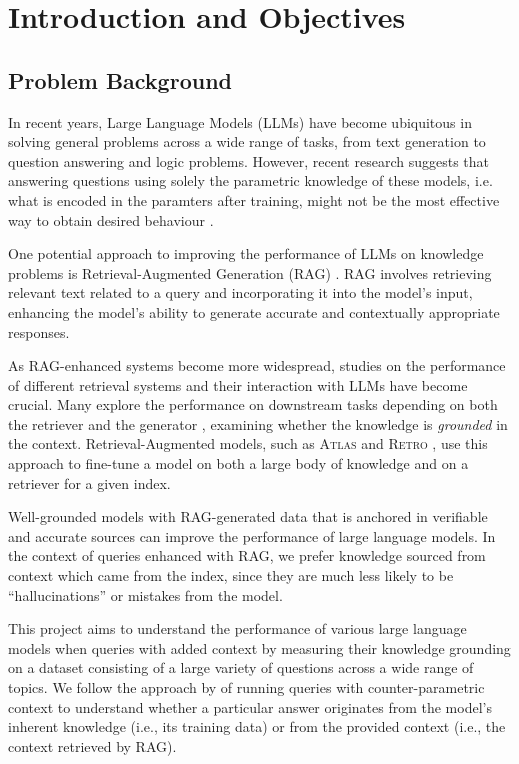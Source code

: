 \section{Introduction and Objectives}

\subsection{Problem Background}

In recent years, Large Language Models (LLMs) have become ubiquitous in solving general problems across a wide range of tasks, from text generation to question answering and logic problems.
However, recent research suggests that answering questions using solely the parametric knowledge of these models, i.e. what is encoded in the paramters after training, might not be the most effective way to obtain desired behaviour 
\citep{treeofthoughts}.

One potential approach to improving the performance of LLMs on knowledge problems is Retrieval-Augmented Generation (RAG) \citep{rag}. 
RAG involves retrieving relevant text related to a query and incorporating it into the model's input, enhancing the model's ability to generate accurate and contextually appropriate responses.

As RAG-enhanced systems become more widespread, studies on the performance of different retrieval systems and their interaction with LLMs have become crucial.
Many explore the performance on downstream tasks depending on both the retriever and the generator \citep{can_rag_models_reason,gpt3}, examining whether the knowledge is \textit{grounded} in the context.
Retrieval-Augmented models, such as \textsc{Atlas} \citep{atlas_foundational} and \textsc{Retro} \citep{retro}, use this approach to fine-tune a model on both a large body of knowledge and on a retriever for a given index.

Well-grounded models with RAG-generated data that is anchored in verifiable and accurate sources can improve the performance of large language models.
In the context of queries enhanced with RAG, we prefer knowledge sourced from context which came from the index, since they are much less likely to be ``hallucinations'' or mistakes from the model.

This project aims to understand the performance of various large language models when queries with added context by measuring their knowledge grounding on a dataset consisting of a large variety of questions across a wide range of topics.
We follow the approach by \citeauthor{factual_recall} of running queries with counter-parametric context to understand whether a particular answer originates from the model's inherent knowledge (i.e., its training data) or from the provided context (i.e., the context retrieved by RAG). 

